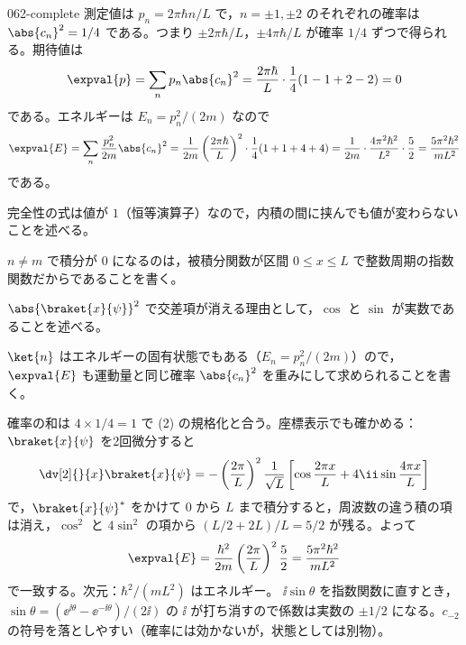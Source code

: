 \documentclass[uplatex,dvipdfmx,a4paper,11pt]{jsarticle}
\begin{document}
\begin{kaisetsu}{062-complete}
 測定値は $p_{n}=2\pi\hbar n/L$ で，$n=\pm1,\pm2$ のそれぞれの確率は $\abs{c_{n}}^{2}=1/4$ である。つまり $\pm2\pi\hbar/L$，$\pm4\pi\hbar/L$ が確率 $1/4$ ずつで得られる。期待値は
\[ \expval{p}=\sum_{n}p_{n}\abs{c_{n}}^{2}=\frac{2\pi\hbar}{L}\cdot\frac{1}{4}(1-1+2-2)=0 \]
である。エネルギーは $E_{n}=p_{n}^{2}/(2m)$ なので
\[ \expval{E}=\sum_{n}\frac{p_{n}^{2}}{2m}\abs{c_{n}}^{2}=\frac{1}{2m}\left(\frac{2\pi\hbar}{L}\right)^{2}\cdot\frac{1}{4}(1+1+4+4)=\frac{1}{2m}\cdot\frac{4\pi^{2}\hbar^{2}}{L^{2}}\cdot\frac{5}{2}=\frac{5\pi^{2}\hbar^{2}}{mL^{2}} \]
である。
\begin{ronten}
  \item {} 完全性の式は値が $1$（恒等演算子）なので，内積の間に挟んでも値が変わらないことを述べる。
  \item {} $n\neq m$ で積分が $0$ になるのは，被積分関数が区間 $0\le x\le L$ で整数周期の指数関数だからであることを書く。
  \item {} $\abs{\braket{x}{\psi}}^{2}$ で交差項が消える理由として，$\cos$ と $\sin$ が実数であることを述べる。
  \item {} $\ket{n}$ はエネルギーの固有状態でもある（$E_{n}=p_{n}^{2}/(2m)$）ので，$\expval{E}$ も運動量と同じ確率 $\abs{c_{n}}^{2}$ を重みにして求められることを書く。
\end{ronten}
\kenzan 確率の和は $4\times1/4=1$ で (2) の規格化と合う。座標表示でも確かめる：$\braket{x}{\psi}$ を2回微分すると
\[ \dv[2]{}{x}\braket{x}{\psi}=-\left(\frac{2\pi}{L}\right)^{2}\frac{1}{\sqrt{L}}\left[\cos\frac{2\pi x}{L}+4\ii\sin\frac{4\pi x}{L}\right] \]
で，$\braket{x}{\psi}^{*}$ をかけて $0$ から $L$ まで積分すると，周波数の違う積の項は消え，$\cos^{2}$ と $4\sin^{2}$ の項から $(L/2+2L)/L=5/2$ が残る。よって
\[ \expval{E}=\frac{\hbar^{2}}{2m}\left(\frac{2\pi}{L}\right)^{2}\frac{5}{2}=\frac{5\pi^{2}\hbar^{2}}{mL^{2}} \]
で一致する。次元：$\hbar^{2}/(mL^{2})$ はエネルギー。
\tsumazuki $\ii\sin\theta$ を指数関数に直すとき，$\sin\theta=(\ee^{\ii\theta}-\ee^{-\ii\theta})/(2\ii)$ の $\ii$ が打ち消すので係数は実数の $\pm1/2$ になる。$c_{-2}$ の符号を落としやすい（確率には効かないが，状態としては別物）。
\end{kaisetsu}
\end{document}
